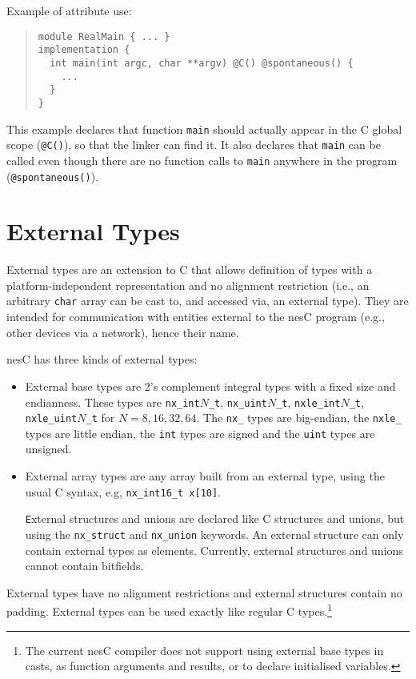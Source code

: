 \documentclass[11pt,letterpaper]{article}
\newcommand{\code}[1]{{\tt #1}}
\newcommand{\nesc}{nesC\xspace}
\begin{document}
Example of attribute use:
\begin{quote} \begin{verbatim}
module RealMain { ... }
implementation {
  int main(int argc, char **argv) @C() @spontaneous() {
    ...
  }
}
\end{verbatim} \end{quote}

This example declares that function \code{main} should actually appear
in the C global scope (\code{@C()}), so that the linker can find it. It
also declares that \code{main} can be called even though there are no
function calls to \code{main} anywhere in the program
(\code{@spontaneous()}). 

\section{External Types}
\label{sec:external-types}

External types are an extension to C that allows definition of types with a
platform-independent representation and no alignment restriction (i.e., an
arbitrary \code{char} array can be cast to, and accessed via, an external
type). They are intended for communication with entities external to
the \nesc program (e.g., other devices via a network), hence their name.

\nesc has three kinds of external types:
\begin{itemize}
\item External base types are 2's complement integral types with a fixed
size and endianness. These types are \code{nx\_int$N$\_t},
\code{nx\_uint$N$\_t}, \code{nxle\_int$N$\_t}, \code{nxle\_uint$N$\_t} for $N =
8, 16, 32, 64$. The \code{nx\_} types are big-endian, the \code{nxle\_} types
are little endian, the \code{int} types are signed and the \code{uint}
types are unsigned.

\item External array types are any array built from an external type, using 
the usual C syntax, e.g, \code{nx\_int16\_t x[10]}.

\code External structures and unions are declared like C structures and
unions, but using the \code{nx\_struct} and \code{nx\_union} keywords. An
external structure can only contain external types as elements. Currently,
external structures and unions cannot contain bitfields.
\end{itemize}

External types have no alignment restrictions and external structures
contain no padding. External types can be used exactly like regular C
types.\footnote{The current \nesc compiler does not support using external
base types in casts, as function arguments and results, or to declare
initialised variables.}
\end{document}
